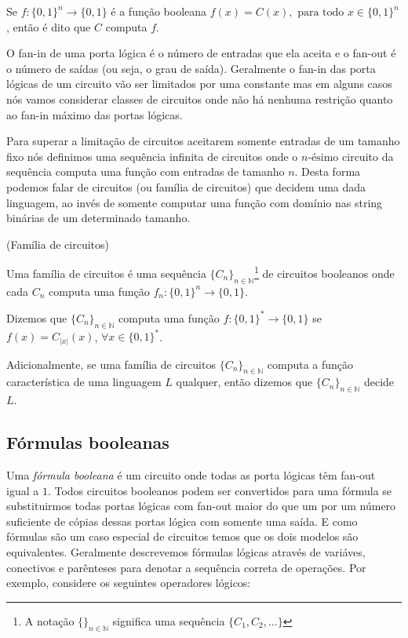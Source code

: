 \begin{defi}
Se $f: \{0, 1\}^{n} \to \{0, 1\}$ é a função booleana $f(x) = C(x), \text{ para todo } x \in \{0, 1\}^{n}$, então é dito que $C$ computa $f$.

\end{defi}

O fan-in de uma porta lógica é o número de entradas que ela aceita e o fan-out é o número de saídas (ou seja, o grau de saída). Geralmente o fan-in das porta lógicas de um circuito vão ser limitados por uma constante mas em alguns casos nós vamos considerar classes de circuitos onde não há nenhuma restrição quanto ao fan-in máximo das portas lógicas.

Para superar a limitação de circuitos aceitarem somente entradas de um tamanho fixo nós definimos uma sequência infinita de circuitos onde o $n\text{-ésimo}$ circuito da sequência computa uma função com entradas de tamanho $n$. Desta forma podemos falar de circuitos (ou família de circuitos) que decidem uma dada linguagem, ao invés de somente computar uma função com domínio nas string binárias de um determinado tamanho.

\begin{defi} (Família de circuitos)

Uma família de circuitos é uma sequência $\{C_{n}\}_{n \in \mathbb{N}}$\footnote{A notação $\{\}_{n \in \mathbb{N}}$ significa uma sequência $\{C_{1}, C_{2}, \dots \}$} de circuitos booleanos onde cada $C_{n}$ computa uma função $f_{n}: \{0, 1\}^{n} \to \{0, 1\}$.

Dizemos que $\{C_{n}\}_{n \in \mathbb{N}}$ computa uma função $f: \{0, 1\}^{*} \to \{0, 1\}$ se $f(x) = C_{\lvert x \rvert}(x)$, $\forall x \in \{0, 1\}^{*}$.

\end{defi}

Adicionalmente, se uma família de circuitos $\{C_{n}\}_{n \in \mathbb{N}}$ computa a função característica de uma linguagem $L$ qualquer, então dizemos que $\{C_{n}\}_{n \in \mathbb{N}}$ decide $L$. 

\subsection{Fórmulas booleanas}

Uma \emph{fórmula booleana} é um circuito onde todas as porta lógicas têm fan-out igual a $1$. Todos circuitos booleanos podem ser convertidos para uma fórmula se substituirmos todas portas lógicas com fan-out maior do que um por um número suficiente de cópias dessas portas lógica com somente uma saída. E como fórmulas são um caso especial de circuitos temos que os dois modelos são equivalentes. Geralmente descrevemos fórmulas lógicas através de variáves, conectivos e parênteses para denotar a sequência correta de operações. Por exemplo, considere os seguintes operadores lógicos:

